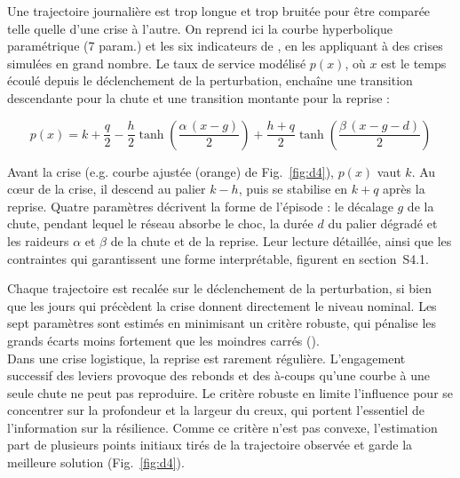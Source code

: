 Une trajectoire journalière est trop longue et trop bruitée pour être comparée telle quelle d'une crise à l'autre. On reprend ici la courbe hyperbolique paramétrique (7 param.) et les six indicateurs de \citet{rahiel2026in4pl}, en les appliquant à des crises simulées en grand nombre. Le taux de service modélisé $p(x)$, où $x$ est le temps écoulé depuis le déclenchement de la perturbation, enchaîne une transition descendante pour la chute et une transition montante pour la reprise :

\begin{equation}
p(x) = k + \frac{q}{2} - \frac{h}{2}\tanh\left(\frac{\alpha\,(x - g)}{2}\right) + \frac{h + q}{2}\tanh\left(\frac{\beta\,(x - g - d)}{2}\right)
\label{eq:5}
\end{equation}

Avant la crise (e.g. courbe ajustée (orange) de Fig.~\ref{fig:d4}), $p(x)$ vaut $k$. Au cœur de la crise, il descend au palier $k - h$, puis se stabilise en $k + q$ après la reprise. Quatre paramètres décrivent la forme de l'épisode : le décalage $g$ de la chute, pendant lequel le réseau absorbe le choc, la durée $d$ du palier dégradé et les raideurs $\alpha$ et $\beta$ de la chute et de la reprise. Leur lecture détaillée, ainsi que les contraintes qui garantissent une forme interprétable, figurent en section~S4.1.

Chaque trajectoire est recalée sur le déclenchement de la perturbation, si bien que les jours qui précèdent la crise donnent directement le niveau nominal. Les sept paramètres sont estimés en minimisant un critère robuste, qui pénalise les grands écarts moins fortement que les moindres carrés (). \\

Dans une crise logistique, la reprise est rarement régulière. L'engagement successif des leviers provoque des rebonds et des à-coups qu'une courbe à une seule chute ne peut pas reproduire. Le critère robuste en limite l'influence pour se concentrer sur la profondeur et la largeur du creux, qui portent l'essentiel de l'information sur la résilience. Comme ce critère n'est pas convexe, l'estimation part de plusieurs points initiaux tirés de la trajectoire observée et garde la meilleure solution (Fig.~\ref{fig:d4}).

\begin{center}

\label{fig:d4}
\end{center}

